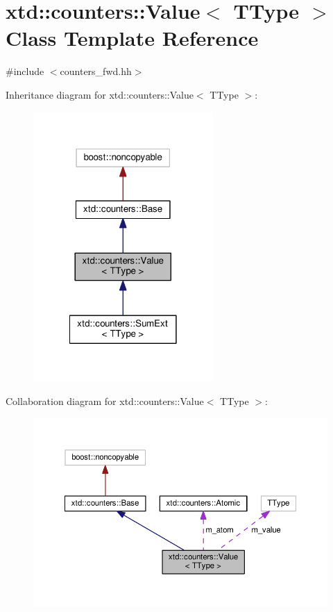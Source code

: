 \hypertarget{classxtd_1_1counters_1_1Value}{\section{xtd\-:\-:counters\-:\-:Value$<$ T\-Type $>$ Class Template Reference}
\label{classxtd_1_1counters_1_1Value}
}


{\ttfamily \#include $<$counters\-\_\-fwd.\-hh$>$}



Inheritance diagram for xtd\-:\-:counters\-:\-:Value$<$ T\-Type $>$\-:
\nopagebreak
\begin{figure}[H]
\begin{center}
\leavevmode
\includegraphics[width=194pt]{classxtd_1_1counters_1_1Value__inherit__graph}
\end{center}
\end{figure}


Collaboration diagram for xtd\-:\-:counters\-:\-:Value$<$ T\-Type $>$\-:
\nopagebreak
\begin{figure}[H]
\begin{center}
\leavevmode
\includegraphics[width=350pt]{classxtd_1_1counters_1_1Value__coll__graph}
\end{center}
\end{figure}
